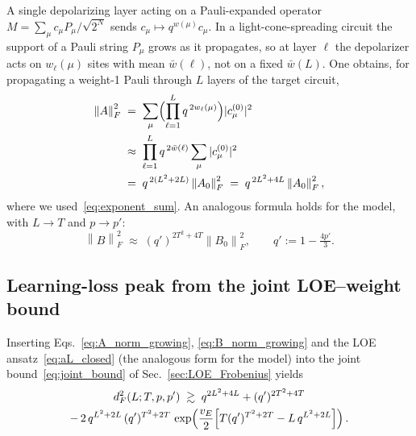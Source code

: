 \documentclass[%
 reprint,
superscriptaddress,
 amsmath,amssymb,
 aps,
]{revtex4-2}
\newcommand{\norm}[1]{\left\lVert#1\right\rVert}
\newcommand{\todoflag}[1]{\textcolor{red}{#1}}%
\begin{document}
A single depolarizing layer acting on a Pauli-expanded operator $M=\sum_\mu c_\mu P_\mu/\sqrt{2^N}$ sends $c_\mu\mapsto q^{w(\mu)}c_\mu$. In a light-cone-spreading circuit the support of a Pauli string $P_\mu$ grows as it propagates, so at layer $\ell$ the depolarizer acts on $w_\ell(\mu)$ sites with mean $\bar w(\ell)$, not on a fixed $\bar w(L)$. One obtains, for propagating a weight-1 Pauli through $L$ layers of the target circuit,
\begin{equation}
\begin{split}
    \norm{A}_F^2 \;&=\; \sum_\mu \Bigl(\prod_{\ell=1}^{L} q^{\,2 w_\ell(\mu)}\Bigr)|c_\mu^{(0)}|^2 \\
    &\approx\; \prod_{\ell=1}^{L} q^{\,2\bar w(\ell)}\sum_\mu |c_\mu^{(0)}|^2 \\
    &=\; q^{\,2(L^2+2L)}\norm{A_0}_F^2 \;=\; q^{\,2L^2+4L}\norm{A_0}_F^2,
\end{split}
    \label{eq:A_norm_growing}
\end{equation}
where we used~\eqref{eq:exponent_sum}. An analogous formula holds for the model, with $L\to T$ and $p\to p'$:
\begin{equation}
    \norm{B}_F^2 \;\approx\; (q')^{2T^2+4T}\norm{B_0}_F^2, \qquad q' := 1-\tfrac{4p'}{3}.
    \label{eq:B_norm_growing}
\end{equation}

\subsection{Learning-loss peak from the joint LOE--weight bound}

Inserting Eqs.~\eqref{eq:A_norm_growing}, \eqref{eq:B_norm_growing} and the LOE ansatz~\eqref{eq:aL_closed} (the analogous form for the model) into the joint bound~\eqref{eq:joint_bound} of Sec.~\ref{sec:LOE_Frobenius} yields
\begin{multline}
    d_F^2(L;T,p,p') \;\gtrsim\; q^{2L^2+4L} + (q')^{2T^2+4T}\\
    -\,2\, q^{L^2+2L}\,(q')^{T^2+2T}\,\exp\!\left(\frac{v_E}{2}\Bigl[T(q')^{T^2+2T}-L\,q^{L^2+2L}\Bigr]\right).
    \label{eq:peak_formula_corrected}
\end{multline}
\end{document}

